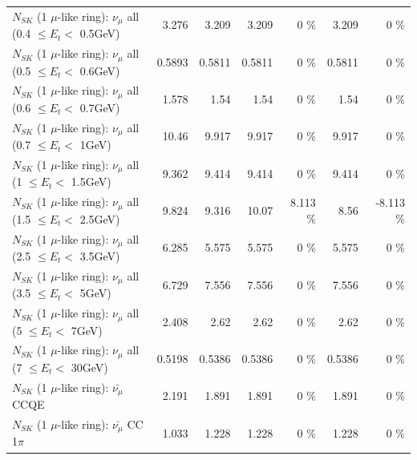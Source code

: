 \begin{table}
\begin{tabular}{| l | r | r | r  r | r  r |}
       $N_{SK}$ (1 $\mu$-like ring): $\nu_{\mu}$ all (0.4 $\leq E_{t} <$ 0.5GeV) &           3.276 &           3.209 &           3.209 &        0 \%  &           3.209 &        0 \%  \\ 
       $N_{SK}$ (1 $\mu$-like ring): $\nu_{\mu}$ all (0.5 $\leq E_{t} <$ 0.6GeV) &          0.5893 &          0.5811 &          0.5811 &        0 \%  &          0.5811 &        0 \%  \\ 
       $N_{SK}$ (1 $\mu$-like ring): $\nu_{\mu}$ all (0.6 $\leq E_{t} <$ 0.7GeV) &           1.578 &            1.54 &            1.54 &        0 \%  &            1.54 &        0 \%  \\ 
         $N_{SK}$ (1 $\mu$-like ring): $\nu_{\mu}$ all (0.7 $\leq E_{t} <$ 1GeV) &           10.46 &           9.917 &           9.917 &        0 \%  &           9.917 &        0 \%  \\ 
         $N_{SK}$ (1 $\mu$-like ring): $\nu_{\mu}$ all (1 $\leq E_{t} <$ 1.5GeV) &           9.362 &           9.414 &           9.414 &        0 \%  &           9.414 &        0 \%  \\ 
       $N_{SK}$ (1 $\mu$-like ring): $\nu_{\mu}$ all (1.5 $\leq E_{t} <$ 2.5GeV) &           9.824 &           9.316 &           10.07 &    8.113 \%  &            8.56 &   -8.113 \%  \\ 
       $N_{SK}$ (1 $\mu$-like ring): $\nu_{\mu}$ all (2.5 $\leq E_{t} <$ 3.5GeV) &           6.285 &           5.575 &           5.575 &        0 \%  &           5.575 &        0 \%  \\ 
         $N_{SK}$ (1 $\mu$-like ring): $\nu_{\mu}$ all (3.5 $\leq E_{t} <$ 5GeV) &           6.729 &           7.556 &           7.556 &        0 \%  &           7.556 &        0 \%  \\ 
           $N_{SK}$ (1 $\mu$-like ring): $\nu_{\mu}$ all (5 $\leq E_{t} <$ 7GeV) &           2.408 &            2.62 &            2.62 &        0 \%  &            2.62 &        0 \%  \\ 
          $N_{SK}$ (1 $\mu$-like ring): $\nu_{\mu}$ all (7 $\leq E_{t} <$ 30GeV) &          0.5198 &          0.5386 &          0.5386 &        0 \%  &          0.5386 &        0 \%  \\ 
\hline
\hline
\hline
                              $N_{SK}$ (1 $\mu$-like ring): $\bar{\nu_\mu}$ CCQE &           2.191 &           1.891 &           1.891 &        0 \%  &           1.891 &        0 \%  \\ 
                         $N_{SK}$ (1 $\mu$-like ring): $\bar{\nu_\mu}$ CC 1$\pi$ &           1.033 &           1.228 &           1.228 &        0 \%  &           1.228 &        0 \%  \\ 

\end{tabular}
\end{table}
